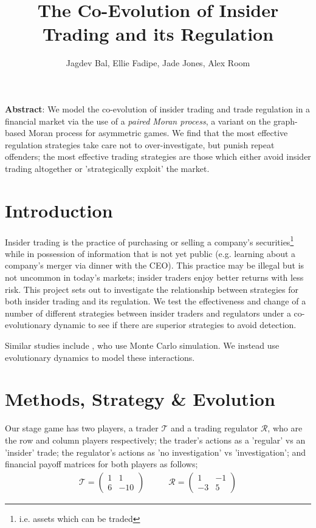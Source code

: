 \documentclass{article}
\title{The Co-Evolution of Insider Trading and its Regulation}
\author{Jagdev Bal, Ellie Fadipe, Jade Jones, Alex Room}
\date{}
\begin{document}
\maketitle
\textbf{Abstract}:
We model the co-evolution of insider trading and trade regulation in a financial market via the use of a \emph{paired Moran process}, a variant on the graph-based Moran process for asymmetric games. We find that the most effective regulation strategies take care not to over-investigate, but punish repeat offenders; the most effective trading strategies are those which either avoid insider trading altogether or 'strategically exploit' the market.

\section{Introduction}
Insider trading is the practice of purchasing or selling a company’s securities\footnote{i.e. assets which can be traded} while in possession of information that is not yet public (e.g. learning about a company's merger via dinner with the CEO). This practice may be illegal but is not uncommon in today's markets; insider traders enjoy better returns with less risk. \citep{bainbridge1998insider} This project sets out to investigate the relationship between strategies for both insider trading and its regulation. We test the effectiveness and change of a number of different strategies between insider traders and regulators under a co-evolutionary dynamic to see if there are superior strategies to avoid detection. 

Similar studies include \citet{smales2017game}, who use Monte Carlo simulation. We instead use evolutionary dynamics to model these interactions.

\section{Methods, Strategy \& Evolution}
Our stage game has two players, a trader $\mathcal{T}$ and a trading regulator $\mathcal{R}$, who are the row and column players respectively; the trader's actions as a 'regular' vs an 'insider' trade; the regulator's actions as 'no investigation' vs 'investigation'; and financial payoff matrices for both players as follows;
\begin{equation*}
\begin{split}
    \mathcal{T} = 
    \begin{pmatrix}
    1 & 1 \\
    6 & -10
    \end{pmatrix}
\end{split}
\quad\quad
\begin{split}
    \mathcal{R} = 
    \begin{pmatrix}
    1 & -1 \\
    -3 & 5
    \end{pmatrix}
\end{split}
\end{equation*}
\end{document}
